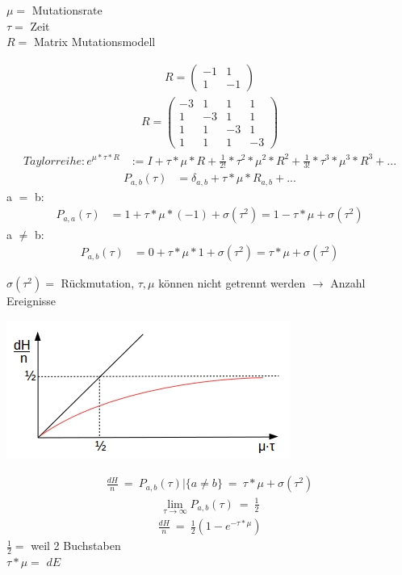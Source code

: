 $\mu = $ Mutationsrate\\
$\tau = $ Zeit\\
$R = $ Matrix Mutationsmodell

\begin{align*}
	R = \begin{pmatrix}
		-1 & 1\\
		 1 &-1
	\end{pmatrix}
\end{align*}
\begin{align*}
	R = \begin{pmatrix}
		-3 & 1 & 1 & 1\\
		 1 &-3 & 1 & 1\\
		 1 & 1 &-3 & 1\\
		 1 & 1 & 1 &-3
	\end{pmatrix}
\end{align*}
\begin{align*}
	Taylorreihe: e^{\mu * \tau * R} &:= I + \tau * \mu * R + \frac{1}{2!} * \tau^2 * \mu^2 * R^2 + \frac{1}{3!} * \tau^3 * \mu^3 * R^3 + ...
\end{align*}
\begin{align*}
	P_{a,b}(\tau) &= \delta_{a,b} + \tau * \mu * R_{a,b} + ...
\end{align*}
a $=$ b:
\begin{align*}
	P_{a,a}(\tau) &= 1 + \tau * \mu * (-1) + \sigma (\tau ^2) = 1 - \tau * \mu + \sigma (\tau ^2)
\end{align*}
a $\neq$ b:
\begin{align*}
	P_{a,b}(\tau) &= 0 + \tau * \mu * 1 + \sigma (\tau ^2) = \tau * \mu + \sigma (\tau ^2)
\end{align*}

$\sigma (\tau ^2) = $ Rückmutation, $\tau, \mu$ können nicht getrennt werden $\rightarrow$ Anzahl Ereignisse
 
\begin{center}
	\includegraphics[scale=1.2]{lectures/161209/pix/pic4.jpg}
\end{center}

\begin{align*}
	\frac{dH}{n}~=~P_{a,b} (\tau) | \{a \neq b\}~=~\tau * \mu + \sigma (\tau ^2)
\end{align*}
\begin{align*}
	\lim\limits_{\tau \rightarrow \infty} P_{a,b} (\tau)~=~ \frac{1}{2}
\end{align*}
\begin{align*}
 	\frac{dH}{n}~=~ \frac{1}{2} (1 - e^{-\tau * \mu})
\end{align*} 
$\frac{1}{2} =$ \color{orange} weil 2 Buchstaben\color{black}\\
$\tau * \mu =$ \color{orange} $dE$ \color{black}

